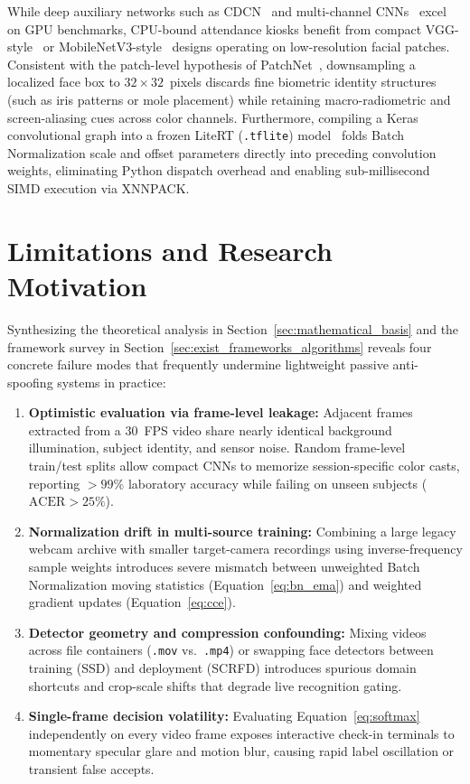While deep auxiliary networks such as CDCN~\cite{yu2020searching} and multi-channel CNNs~\cite{george2020biometric} excel on GPU benchmarks, CPU-bound attendance kiosks benefit from compact VGG-style~\cite{simonyan2015very} or MobileNetV3-style~\cite{howard2019searching} designs operating on low-resolution facial patches. Consistent with the patch-level hypothesis of PatchNet~\cite{wang2022patchnet}, downsampling a localized face box to $32\times32$~pixels discards fine biometric identity structures (such as iris patterns or mole placement) while retaining macro-radiometric and screen-aliasing cues across color channels. Furthermore, compiling a Keras convolutional graph into a frozen LiteRT (\texttt{.tflite}) model~\cite{david2021tensorflow} folds Batch Normalization scale and offset parameters directly into preceding convolution weights, eliminating Python dispatch overhead and enabling sub-millisecond SIMD execution via XNNPACK.

\section{Limitations and Research Motivation}
\label{sec:limitations_motivation}

Synthesizing the theoretical analysis in Section~\ref{sec:mathematical_basis} and the framework survey in Section~\ref{sec:exist_frameworks_algorithms} reveals four concrete failure modes that frequently undermine lightweight passive anti-spoofing systems in practice:
\begin{enumerate}
    \item \textbf{Optimistic evaluation via frame-level leakage:} Adjacent frames extracted from a $30$~FPS video share nearly identical background illumination, subject identity, and sensor noise. Random frame-level train/test splits allow compact CNNs to memorize session-specific color casts, reporting $>99\%$ laboratory accuracy while failing on unseen subjects ($\text{ACER} > 25\%$).
    \item \textbf{Normalization drift in multi-source training:} Combining a large legacy webcam archive with smaller target-camera recordings using inverse-frequency sample weights introduces severe mismatch between unweighted Batch Normalization moving statistics (Equation~\eqref{eq:bn_ema}) and weighted gradient updates (Equation~\eqref{eq:cce}).
    \item \textbf{Detector geometry and compression confounding:} Mixing videos across file containers (\texttt{.mov} vs.\ \texttt{.mp4}) or swapping face detectors between training (SSD) and deployment (SCRFD) introduces spurious domain shortcuts and crop-scale shifts that degrade live recognition gating.
    \item \textbf{Single-frame decision volatility:} Evaluating Equation~\eqref{eq:softmax} independently on every video frame exposes interactive check-in terminals to momentary specular glare and motion blur, causing rapid label oscillation or transient false accepts.
\end{enumerate}

